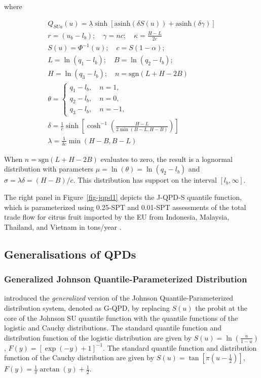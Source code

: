 \documentclass[
  fleqn,
  deca,
  blindrev
]{informs4}
\begin{document}
where

\[
\begin{gathered}
Q_{SUa}(u) = \lambda\sinh\left[\text{asinh}(\delta S(u)) + \text{asinh}(\delta\gamma)\right]\\
r=(u_b-l_b); \quad \gamma=nc; \quad \kappa=\frac{H-L}{2c}\\
S(u)=\Phi^{-1}(u); \quad c=S(1-\alpha);\\
L=\ln(q_1-l_b); \quad  B=\ln(q_2-l_b);\\
H=\ln(q_3-l_b); \quad n=\text{sgn}(L+H-2B)\\
\theta=\begin{cases}
q_1-l_b, \quad n=1,\\
q_2-l_b, \quad n=0,\\
q_3-l_b, \quad n=-1,\end{cases}\\
\delta=\frac{1}{c}\sinh\left[\cosh^{-1}\left(\frac{H-L}{2\min(B-L,H-B)}\right)\right]\\
\lambda=\frac{1}{\delta c}\min(H-B, B-L)
\end{gathered}
\]

When \(n=\text{sgn}(L+H-2B)\) evaluates to zero, the result is a
lognormal distribution with parameters \(\mu=\ln(\theta)=\ln(q_2-l_b)\)
and \(\sigma=\lambda\delta=(H-B)/c\). This distribution has support on
the interval \([l_b,\infty]\).

The right panel in Figure~\ref{fig-jqpd1} depicts the J-QPD-S quantile
function, which is parameterized using 0.25-SPT and 0.01-SPT assessments
of the total trade flow for citrus fruit imported by the EU from
Indonesia, Malaysia, Thailand, and Vietnam in tons/year
\citep{efsa2023RiskAssessmentCitripestis}.

\subsection{Generalisations of QPDs}\label{generalisations-of-qpds}

\subsubsection{Generalized Johnson Quantile-Parameterized
Distribution}\label{generalized-johnson-quantile-parameterized-distribution}

\citet{hadlock2019GeneralizedJohnsonQuantileParameterized} introduced
the \emph{generalized} version of the Johnson Quantile-Parameterized
distribution system, denoted as G-QPD, by replacing \(S(u)\) the probit
at the core of the Johnson SU quantile function with the quantile
functions of the logistic and Cauchy distributions. The standard
quantile function and distribution function of the logistic distribution
are given by \(S(u)= \ln\left(\frac{u}{1-u}\right)\),
\(F(y)=[\exp(-y)+1]^{-1}\). The standard quantile function and
distribution function of the Cauchy distribution are given by
\(S(u)= \tan\left[\pi\left(u-\frac{1}{2}\right)\right]\),
\(F(y)=\frac{1}{ \pi}\arctan(y)+\frac{1}{2}\).
\end{document}
